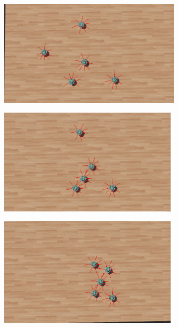 \begin{figure}[h!]
    \centering
    \begin{subfigure}[b]{0.48\textwidth}
    \centering
    \includegraphics[width=\textwidth]{chapter5/image/buoc0.png}
    \caption{}
    \end{subfigure}
    \begin{subfigure}[b]{0.48\textwidth}
    \centering
    \includegraphics[width=\textwidth]{chapter5/image/buoc2.png}
    \caption{}
    \end{subfigure}
    \begin{subfigure}[b]{0.48\textwidth}
    \centering
    \includegraphics[width=\textwidth]{chapter5/image/buoc1.png}

\end{subfigure}
\end{figure}
